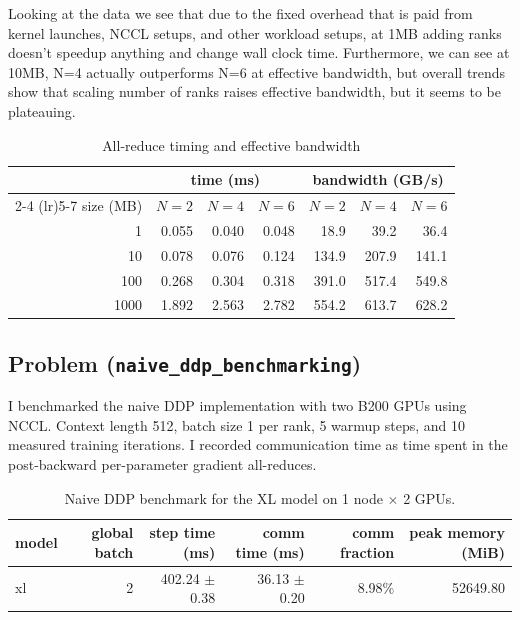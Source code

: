 \documentclass[11pt]{article}
\begin{document}
Looking at the data we see that due to the fixed overhead that is paid from kernel launches, NCCL setups, 
and other workload setups, at 1MB adding ranks doesn't speedup anything and change wall clock time.
Furthermore, we can see at 10MB, N=4 actually outperforms N=6 at effective bandwidth, but overall trends show
that scaling number of ranks raises effective bandwidth, but it seems to be plateauing.

\begin{table}[H]
\centering
\caption{All-reduce timing and effective bandwidth}
\setlength{\tabcolsep}{6pt}
\begin{tabular}{rrrrrrr}
\toprule
 & \multicolumn{3}{c}{time (ms)} & \multicolumn{3}{c}{bandwidth (GB/s)} \\
\cmidrule(lr){2-4} \cmidrule(lr){5-7}
size (MB) & $N{=}2$ & $N{=}4$ & $N{=}6$ & $N{=}2$ & $N{=}4$ & $N{=}6$ \\
\midrule
1    & 0.055 & 0.040 & 0.048 &  18.9 &  39.2 &  36.4 \\
10   & 0.078 & 0.076 & 0.124 & 134.9 & 207.9 & 141.1 \\
100  & 0.268 & 0.304 & 0.318 & 391.0 & 517.4 & 549.8 \\
1000 & 1.892 & 2.563 & 2.782 & 554.2 & 613.7 & 628.2 \\
\bottomrule
\end{tabular}
\end{table}

\vspace{6em}


\subsection{Problem (\texttt{naive\_ddp\_benchmarking})}

I benchmarked the naive DDP implementation with two B200 GPUs using NCCL. Context length 512, batch size 1 per rank, 5 warmup steps, and 10 measured training iterations. I recorded communication time as time spent in the post-backward per-parameter gradient all-reduces.

\begin{table}[H]
\centering
\caption{Naive DDP benchmark for the XL model on 1 node $\times$ 2 GPUs.}
\begin{tabular}{lrrrrr}
\toprule
model & global batch & step time (ms) & comm time (ms) & comm fraction & peak memory (MiB) \\
\midrule
xl & 2 & 402.24 $\pm$ 0.38 & 36.13 $\pm$ 0.20 & 8.98\% & 52649.80 \\
\bottomrule
\end{tabular}
\end{table}
\end{document}
